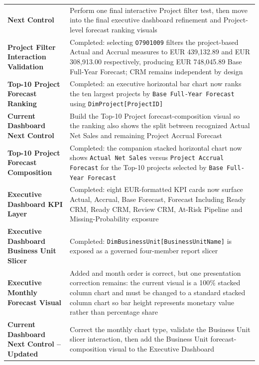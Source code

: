 \documentclass[11pt,a4paper]{article}
\begin{document}
\begin{summarybox}
\begin{tabularx}{\textwidth}{
    >{\bfseries\color{AaltoNavy}}p{4.3cm}
    X
}
Next Control
&
Perform one final interactive Project filter test, then move into the final
executive dashboard refinement and Project-level forecast ranking visuals
\\


Project Filter Interaction Validation
&
Completed: selecting \texttt{O7901009} filters the project-based Actual and Accrual
measures to EUR 439,132.89 and EUR 308,913.00 respectively, producing
EUR 748,045.89 Base Full-Year Forecast; CRM remains independent by design
\\

Top-10 Project Forecast Ranking
&
Completed: an executive horizontal bar chart now ranks the ten largest projects by
\texttt{Base Full-Year Forecast} using \texttt{DimProject[ProjectID]}
\\

Current Dashboard Next Control
&
Build the Top-10 Project forecast-composition visual so the ranking also shows the
split between recognized Actual Net Sales and remaining Project Accrual Forecast
\\


Top-10 Project Forecast Composition
&
Completed: the companion stacked horizontal chart now shows
\texttt{Actual Net Sales} versus \texttt{Project Accrual Forecast} for the
Top-10 projects selected by \texttt{Base Full-Year Forecast}
\\

Executive Dashboard KPI Layer
&
Completed: eight EUR-formatted KPI cards now surface Actual, Accrual, Base Forecast,
Forecast Including Ready CRM, Ready CRM, Review CRM, At-Risk Pipeline and
Missing-Probability exposure
\\

Executive Dashboard Business Unit Slicer
&
Completed: \texttt{DimBusinessUnit[BusinessUnitName]} is exposed as a governed
four-member report slicer
\\

Executive Monthly Forecast Visual
&
Added and month order is correct, but one presentation correction remains:
the current visual is a 100\% stacked column chart and must be changed to a
standard stacked column chart so bar height represents monetary value rather
than percentage share
\\

Current Dashboard Next Control -- Updated
&
Correct the monthly chart type, validate the Business Unit slicer interaction,
then add the Business Unit forecast-composition visual to the Executive Dashboard
\\



\end{tabularx}
\end{summarybox}
\end{document}
